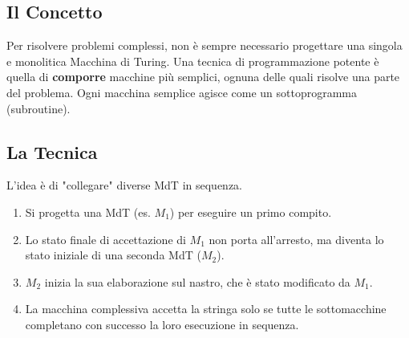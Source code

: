 \documentclass[a4paper]{article}
\theoremstyle{definition} %
\begin{document}
\subsection{Il Concetto}
Per risolvere problemi complessi, non è sempre necessario progettare una singola e monolitica Macchina di Turing. Una tecnica di programmazione potente è quella di \textbf{comporre} macchine più semplici, ognuna delle quali risolve una parte del problema. Ogni macchina semplice agisce come un sottoprogramma (subroutine).

\subsection{La Tecnica}
L'idea è di "collegare" diverse MdT in sequenza.
\begin{enumerate}
    \item Si progetta una MdT (es. $M_1$) per eseguire un primo compito.
    \item Lo stato finale di accettazione di $M_1$ non porta all'arresto, ma diventa lo stato iniziale di una seconda MdT ($M_2$).
    \item $M_2$ inizia la sua elaborazione sul nastro, che è stato modificato da $M_1$.
    \item La macchina complessiva accetta la stringa solo se tutte le sottomacchine completano con successo la loro esecuzione in sequenza.
\end{enumerate}
\end{document}
